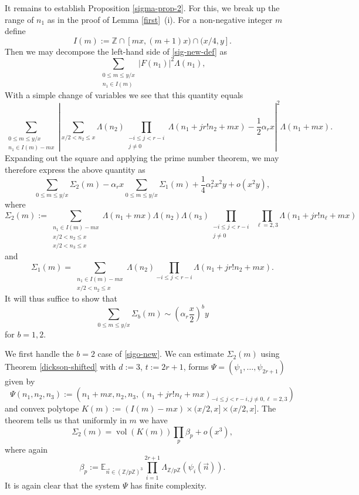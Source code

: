 \documentclass[12pt]{amsart}
\numberwithin{equation}{section}  %
\theoremstyle{remark}
\theoremstyle{plain}
\numberwithin{equation}{section}
\newcommand{\Z}{\mathbb{Z}}
\newcommand{\E}{\mathbb{E}}  %
\renewcommand{\le}{\leqslant}
\renewcommand{\leq}{\leqslant}
\renewcommand{\(}{\left(}
\renewcommand{\)}{\right)}
\newcommand{\asym}{\sim}   %
\newcommand{\vect}[1]{{\ensuremath{\vec{#1}}}}
\newcommand{\vol}{\operatorname{vol}}
\begin{document}
It remains to establish Proposition \ref{sigma-prop-2}.  For this, we break up the range of
$n_1$ as in the proof of Lemma \ref{first}~(i).
 For a non-negative integer $m$ define
\[ I(m) := \Z \cap [mx,(m+1)x) \cap (x/4, y].\]
Then we may decompose the left-hand side of \eqref{sig-new-def} as
\[ \sum_{\substack{0 \leq m \leq y/x\\ n_1 \in I(m)}}  |F(n_1)|^2\Lambda(n_1),\]
 With a simple change of variables we see that this quantity equals
\[ \sum_{\substack{0 \leq m \leq  y/x \\ n_1 \in I(m) - mx}} \left| \sum_{x/2<n_2\le x} \!\! \Lambda(n_2)\!\!\!\! \prod_{\substack{-i \leq j < r-i \\ j \neq 0}} \!\!\Lambda(n_1 +j r! n_2 + mx)  - \frac{1}{2}\alpha_r x\right |^2\Lambda(n_1 + mx). \]
Expanding out the square and applying the prime number theorem, we may therefore express the above quantity as
\[ \sum_{0\leq m \leq y/x} \Sigma_2(m) - \alpha_r x \sum_{0 \leq m
  \leq y/x} \Sigma_1(m) + \frac{1}{4}\alpha_r^2 x^2 y + o(x^2 y),\] 
where
\[ \Sigma_2(m) :=  \sum_{\substack{n_1 \in I(m) - mx \\ x/2<n_2 \le x
    \\ x/2 < n_3 \le x}}  \Lambda(n_1 + mx) \Lambda(n_2)\Lambda(n_3)
\!\!\!\prod_{\substack{-i \leq j < r - i \\ j \neq 0 }} \;
\prod_{\ell=2,3} \Lambda(n_1 + j r! n_{\ell} + mx) \]
and
\[ \Sigma_1(m) = \sum_{\substack{n_1 \in I(m) - mx \\ x/2<n_2\le x}}  \Lambda(n_2)\prod_{-i \leq j < r - i}\Lambda(n_1 +j r! n_2 + mx) .\]
It will thus suffice to show that
\begin{equation}\label{sigo-new}  \sum_{0 \leq m \leq y/x} \Sigma_b(m) \asym \left(\alpha_r \frac{x}{2}\right)^b y
\end{equation}
for $b=1,2$.

We first handle the $b=2$ case of \eqref{sigo-new}.  
We can estimate $\Sigma_2(m)$ using Theorem \ref{dickson-shifted} with $d := 3$, $t := 2r + 1$, forms $\Psi = (\psi_1,\dots, \psi_{2r+1})$ given by
\[ \Psi(n_1,n_2,n_3) := (n_1 + mx, n_2,n_3, (n_1 + jr! n_{\ell} + mx)_{-i\leq j < r-i, j \neq 0, \ell= 2,3} )\] and convex polytope $K(m) := (I(m) - mx) \times (x/2, x] \times (x/2,x]$. The theorem tells us that uniformly in $m$ we have
\begin{equation}\label{sig-1-prelim-new} \Sigma_2(m) = \vol(K(m)) \prod_p \beta_p + o(x^3),\end{equation} where again
\[ \beta_p := \E_{\vect{n} \in (\Z/p\Z)^3} \prod_{i = 1}^{2r +1} \Lambda_{\Z/p\Z}(\psi_i(\vect{n})).\]
It is again clear that the system $\Psi$ has finite complexity. 
\end{document}
